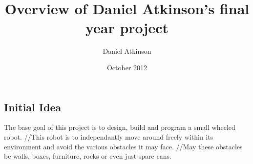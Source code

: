 \documentclass{article}
\title{Overview of Daniel Atkinson's final year project}
\author{Daniel Atkinson}
\date{October 2012}
\begin{document}
   \maketitle

\subsection*{Initial Idea}
The base goal of this project is to design, build and program a small wheeled robot.
//This robot is to independantly move around freely within its environment and avoid the various obstacles it may face.
//May these obstacles be walls, boxes, furniture, rocks or even just spare cans.
\end{document}
